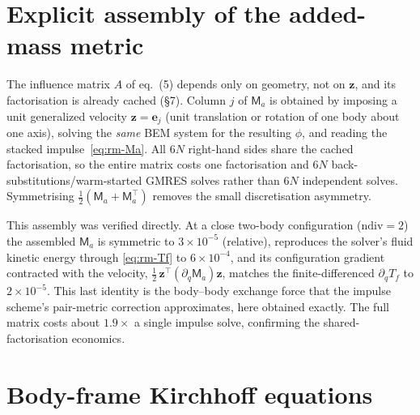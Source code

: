 \documentclass[11pt]{article}
\newcommand{\Ma}{\mathsf{M}_{a}}
\newcommand{\zz}{\mathbf{z}}
\newcommand{\half}{\tfrac12}
\begin{document}
\section{Explicit assembly of the added-mass metric}
\label{sec:rm-assembly}

The influence matrix $A$ of eq.~(5) depends only on geometry, not on $\zz$, and
its factorisation is already cached (\S7). Column $j$ of $\Ma$ is obtained by
imposing a unit generalized velocity $\zz=\mathbf e_j$ (unit translation or
rotation of one body about one axis), solving the \emph{same} BEM system for the
resulting $\phi$, and reading the stacked impulse~\eqref{eq:rm-Ma}. All $6N$
right-hand sides share the cached factorisation, so the entire matrix costs one
factorisation and $6N$ back-substitutions/warm-started GMRES solves rather than
$6N$ independent solves. Symmetrising $\tfrac12(\Ma+\Ma^\top)$ removes the small
discretisation asymmetry.

This assembly was verified directly. At a close two-body configuration
($\mathrm{ndiv}=2$) the assembled $\Ma$ is symmetric to $3\times10^{-5}$
(relative), reproduces the solver's fluid kinetic energy through
\eqref{eq:rm-Tf} to $6\times10^{-4}$, and its configuration gradient contracted
with the velocity, $\half\,\zz^\top(\partial_q\Ma)\zz$, matches the
finite-differenced $\partial_q T_f$ to $2\times10^{-5}$. This last identity is
the body--body exchange force that the impulse scheme's pair-metric correction
approximates, here obtained exactly. The full matrix costs about $1.9\times$ a
single impulse solve, confirming the shared-factorisation economics.

\section{Body-frame Kirchhoff equations}
\label{sec:rm-kirchhoff}
\end{document}
